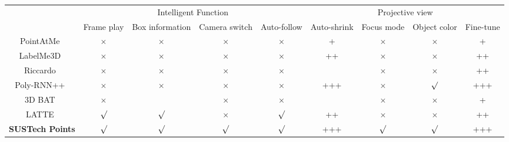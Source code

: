 \documentclass[letterpaper, 10 pt, conference]{ieeeconf}  %
\begin{document}
\begin{table}[]
	\begin{tabular}{c||c|c|c|c||c|c|c|c}
		\hline
		\hline
		\multirow{2}{*}{} & \multicolumn{4}{c||}{Intelligent Function}                         & \multicolumn{4}{c}{Projective view}                 \\
		
		\cline{2-9}     & Frame play & Box information & Camera switch & Auto-follow & Auto-shrink & Focus mode & Object color & Fine-tune \\ 
		
		\hline
		PointAtMe~\cite{pointatme}         & $\times$         &   $\times$      &   $\times$    &  $\times$   &      +      &   $\times$ &   $\times$   &    +       \\ \hline
		LabelMe3D~\cite{LabelMe3D}         & $\times$         &   $\times$      &   $\times$    &  $\times$   &     ++      &   $\times$ &   $\times$   &   ++       \\ \hline
		Riccardo~\cite{monica2017multi}          & $\times$         &   $\times$      &   $\times$    &  $\times$   &             &   $\times$ &   $\times$   &   ++       \\ \hline
		Poly-RNN++~\cite{PolyRNN++}        & $\times$         &   $\times$      &   $\times$    &  $\times$   &     +++     &   $\times$ &   $\surd$    &  +++        \\ \hline
		3D BAT~\cite{Zimmer20193DBA}            & $\times$         &                 &   $\times$    &  $\times$   &             &   $\times$ &   $\times$   &    +        \\ \hline
		LATTE~\cite{Wang2019LATTEAL}           & $\surd$          &   $\surd$       &   $\times$    &  $\surd$    &     ++      &   $\times$ &   $\times$   &   ++        \\ \hline
		\textbf{SUSTech Points}              & $\surd$          &   $\surd$       &   $\surd$     &  $\surd$    &      +++      &   $\surd$  &   $\surd$    &  +++        \\ \hline \hline
	\end{tabular}
	\begin{tabular}{p{17cm}}

\end{tabular}
\end{table}
\end{document}
